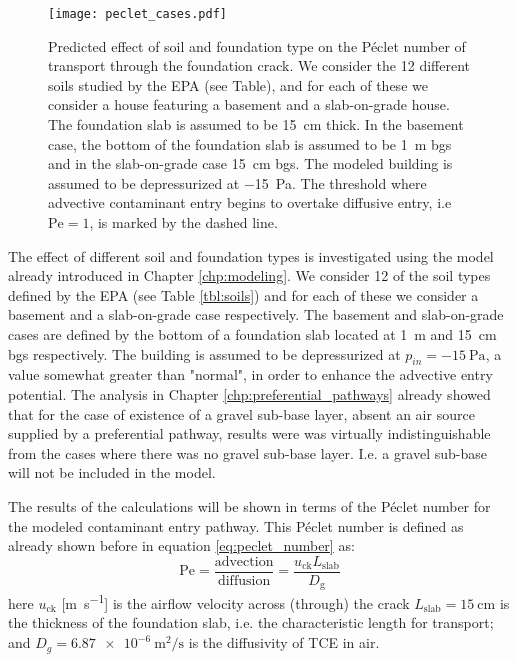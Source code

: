 \begin{figure}[htb!]
  \centering
  \texttt{[image: peclet\_cases.pdf]}
  \caption[Predicted effect of soil and foundation type on the Péclet number of transport through the foundation crack.]{Predicted effect of soil and foundation type on the Péclet number of transport through the foundation crack. We consider the 12 different soils studied by the EPA (see Table), and for each of these we consider a house featuring a basement and a slab-on-grade house. The foundation slab is assumed to be \SI{15}{\centi\metre} thick. In the basement case, the bottom of the foundation slab is assumed to be \SI{1}{\metre} bgs and in the slab-on-grade case  \SI{15}{\centi\metre} bgs. The modeled building is assumed to be depressurized at \SI{-15}{\pascal}. The threshold where advective contaminant entry begins to overtake diffusive entry, i.e $\mathrm{Pe} = 1$, is marked by the dashed line.}
  \label{fig:peclet_soil_foundation_type}
\end{figure}

The effect of different soil and foundation types is investigated using the model already introduced in Chapter \ref{chp:modeling}.
We consider 12 of the soil types defined by the EPA (see Table \ref{tbl:soils}) and for each of these we consider a basement and a slab-on-grade case respectively.
The basement and slab-on-grade cases are defined by the bottom of a foundation slab located at \SI{1}{\metre} and \SI{15}{\centi\metre} bgs respectively.
The building is assumed to be depressurized at $p_{in} = \SI{-15}{\pascal}$, a value somewhat greater than "normal", in order to enhance the advective entry potential.
The analysis in Chapter \ref{chp:preferential_pathways} already showed that for the case of existence of a gravel sub-base layer, absent an air source supplied by a preferential pathway, results were was virtually indistinguishable from the cases where there was no gravel sub-base layer.
I.e. a gravel sub-base will not be included in the model.\par

The results of the calculations will be shown in terms of the Péclet number for the modeled contaminant entry pathway.
This Péclet number is defined as already shown before in equation \eqref{eq:peclet_number} as:
\begin{equation}
    \mathrm{Pe} = \frac{\mathrm{advection}}{\mathrm{diffusion}} = \frac{u_\mathrm{ck} L_\mathrm{slab}}{D_\mathrm{g}}
\end{equation}
here $u_\mathrm{ck}$ [\si{\metre\per\second}] is the airflow velocity across (through) the crack
$L_\mathrm{slab} = \SI{15}{\centi\metre}$ is the thickness of the foundation slab, i.e. the characteristic length for transport;
and $D_g = \SI{6.87e-6}{\metre\squared\per\second}$ is the diffusivity of TCE in air.\par

